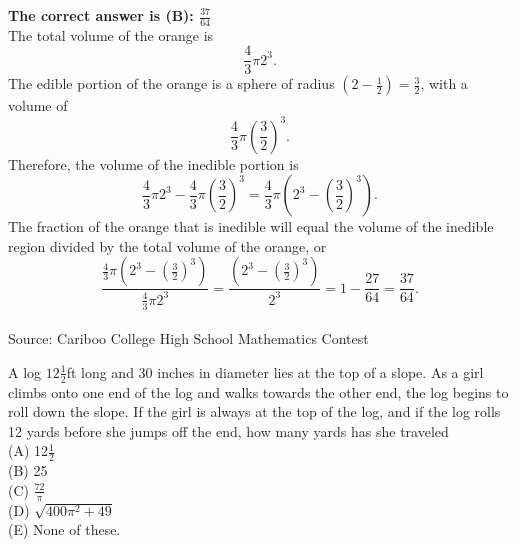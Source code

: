 \documentclass{article}
\begin{document}
\textbf{The correct answer is (B): $\frac{37}{64}$}\\[1 ex]
The total volume of the orange is
\begin{equation*}
\frac{4}{3}\pi 2^3.
\end{equation*}
The edible portion of the orange is a sphere of radius $(2-\frac{1}{2})=\frac{3}{2}$, with a volume of
\begin{equation*}
\frac{4}{3}\pi(\frac{3}{2})^3.
\end{equation*}
Therefore, the volume of the inedible portion is
\begin{equation*}
\frac{4}{3}\pi 2^3-\frac{4}{3}\pi(\frac{3}{2})^3=\frac{4}{3}\pi( 2^3-(\frac{3}{2})^3).
\end{equation*}
The fraction of the orange that is inedible will equal the volume of the inedible region divided by the total volume of the orange, or
\begin{equation*}\frac{\frac{4}{3}\pi( 2^3-(\frac{3}{2})^3)}{\frac{4}{3}\pi 2^3}=\frac{( 2^3-(\frac{3}{2})^3)}{2^3}=1-\frac{27}{64}=\frac{37}{64}.
\end{equation*}
\\[5 ex]

\scriptsize
Source: Cariboo College High School Mathematics Contest

\normalsize
A log $12\frac{1}{2}$ft long and 30 inches in diameter lies at the top of a slope. As a girl climbs onto one end of the log and walks towards the other end, the log begins to roll down the slope. If the girl is always at the top of the log, and if the log rolls 12 yards before she jumps off the end, how many yards has she traveled\\
(A) 12$\frac{1}{2}$\\
(B) 25\\
(C) $\frac{72}{\pi}$\\
(D) $\sqrt{400\pi^{2}+49}$\\
(E) None of these.\\

\end{document}
